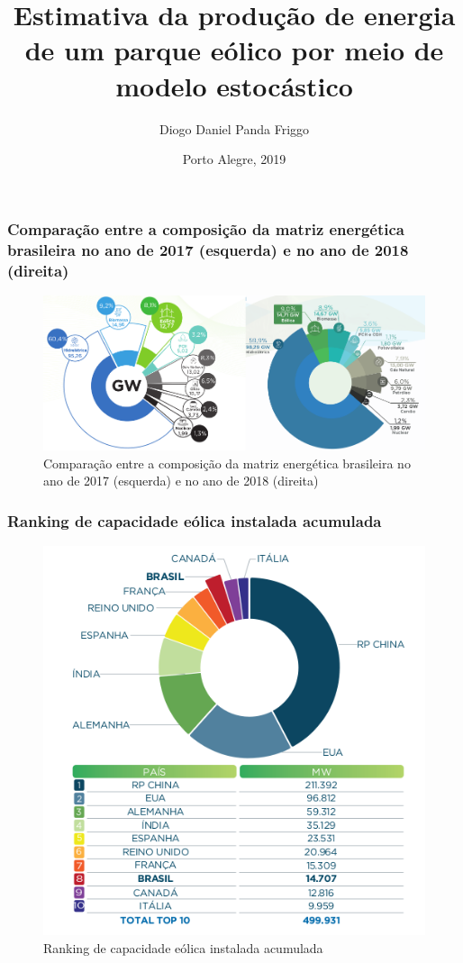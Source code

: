 \documentclass{beamer}
\title[]{Estimativa da produção de energia de um parque eólico por meio de modelo estocástico}
\author[]{Diogo Daniel Panda Friggo}
\institute
{
	Universidade Federal do Rio Grande do Sul\newline\newline
	Orientador: Carlo Requião da Cunha
}
\date{Porto Alegre, 2019}
\begin{document}
    
\begin{frame}
	\titlepage
\end{frame}

\begin{frame}
	\frametitle{Comparação entre a composição da matriz energética brasileira no ano de 2017 (esquerda) e no ano de 2018 (direita)}
	\begin{figure}
		\centering
		\includegraphics[width=\textwidth]{abe_2017_2018}
		\caption{Comparação entre a composição da matriz energética brasileira no ano de 2017 (esquerda) e no ano de 2018 (direita)}
	\end{figure}
\end{frame}

\begin{frame}
	\frametitle{Ranking de capacidade eólica instalada acumulada}
	\begin{figure}
		\centering
		\includegraphics[width=\textwidth]{abe_maiores_produtores}
		\caption{Ranking de capacidade eólica instalada acumulada}
	\end{figure}
\end{frame}
\end{document}
